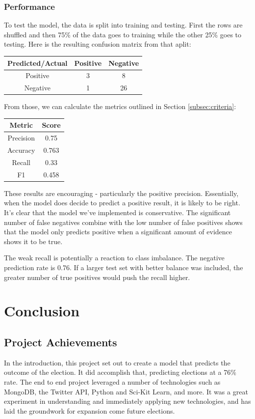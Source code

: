 \documentclass[11pt, twoside, reqno]{book}
\begin{document}
\subsection{Performance}
\hspace{0.2in} To test the model, the data is split into training and testing. First the rows are shuffled and then 75\% of the data goes to training while the other 25\% goes to testing. Here is the resulting confusion matrix from that aplit:
\begin{center}
\begin{tabular}{|c|c|c|}
	\hline
	Predicted/Actual & Positive & Negative \\
	\hline
	Positive & 3 & 8 \\
	\hline
	Negative & 1 &  26\\
	\hline
\end{tabular}
\end{center}
From those, we can calculate the metrics outlined in Section \ref{subsec:criteria}:
\begin{center}
\begin{tabular}{|c|c|}
	\hline
	Metric & Score \\
	\hline
	Precision & 0.75 \\
	\hline
	Accuracy & 0.763\\
	\hline
	Recall & 0.33 \\
	\hline
	F1 & 0.458 \\
	\hline
\end{tabular}
\end{center}

These results are encouraging - particularly the positive precision. Essentially, when the model does decide to predict a positive result, it is likely to be right. It's clear that the model we've implemented is conservative. The significant number of false negatives combine with the low number of false positives shows that the model only predicts positive when a significant amount of evidence shows it to be true. 

The weak recall is potentially a reaction to class imbalance. The negative prediction rate is 0.76. If a larger test set with better balance was included, the greater number of true positives would push the recall higher. 

\chapter{Conclusion}
\section{Project Achievements}
In the introduction, this project set out to create a model that predicts the outcome of the election. It did accomplish that, predicting elections at a 76\% rate. The end to end project leveraged a number of technologies such as MongoDB, the Twitter API, Python and Sci-Kit Learn, and more. It was a great experiment in understanding and immediately applying new technologies, and has laid the groundwork for expansion come future elections. 
\end{document}
